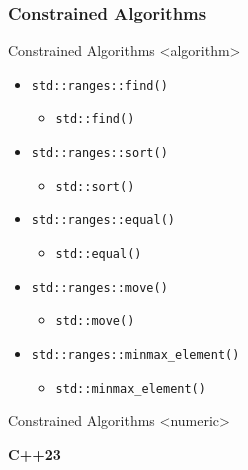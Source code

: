 \subsubsection{Constrained Algorithms}

\begin{frame}{Constrained Algorithms <algorithm>}
    \begin{itemize}
        \item<1-> \texttt{std::ranges::find()}
            \begin{itemize} \item \texttt{std::find()} \end{itemize}
        \item<2-> \texttt{std::ranges::sort()}
            \begin{itemize} \item \texttt{std::sort()} \end{itemize}
        \item<3-> \texttt{std::ranges::equal()}
            \begin{itemize} \item \texttt{std::equal()} \end{itemize}
        \item<4-> \texttt{std::ranges::move()}
            \begin{itemize} \item \texttt{std::move()} \end{itemize}
        \item<5-> \texttt{std::ranges::minmax_element()}
            \begin{itemize} \item \texttt{std::minmax_element()} \end{itemize}
    \end{itemize}
\end{frame}

\begin{frame}{Constrained Algorithms <numeric>}
    \begin{center}
        \textbf{C++23}
    \end{center}
\end{frame}